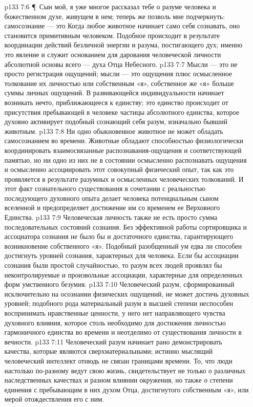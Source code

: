 \vs p133 7:6 \P\ Сын мой, я уже многое рассказал тебе о разуме человека и божественном духе, живущем в нем; теперь же позволь мне подчеркнуть: самосознание --- это  Когда любое животное начинает само себя сознавать, оно становится примитивным человеком. Подобное происходит в результате координации действий безличной энергии и разума, постигающего дух; именно это явление и служит основанием для дарования человеческой личности абсолютной основы всего --- духа Отца Небесного.
\vs p133 7:7 Мысли --- это не просто регистрация ощущений; мысли --- это ощущения плюс осмысленное толкование их личностью или собственным «я», собственное же «я» больше суммы личных ощущений. В развивающейся индивидуальности начинает возникать нечто, приближающееся к единству; это единство происходит от присутствия пребывающей в человеке частицы абсолютного единства, которое духовно активирует подобный сознающий себя разум, изначально бывший животным.
\vs p133 7:8 Ни одно обыкновенное животное не может обладать самосознанием во времени. Животные обладают способностью физиологически координировать взаимосвязанные распознавания\hyp{}ощущения и соответствующей памятью, но ни одно из них не в состоянии осмысленно распознавать ощущения и осмысленно ассоциировать этот совокупный физический опыт, так как это проявляется в результате разумных и осмысленных человеческих толкований. И этот факт сознательного существования в сочетании с реальностью последующего духовного опыта делает человека потенциальным сыном вселенной и предопределяет достижение им со временем ее Верховного Единства.
\vs p133 7:9 Человеческая личность также не есть просто сумма последовательных состояний сознания. Без эффективной работы сортировщика и ассоциатора сознания не было бы и достаточного единства, гарантирующего возникновение собственного «я». Подобный разобщенный ум едва ли способен достигнуть уровней сознания, характерных для человека. Если бы ассоциации сознания были простой случайностью, то разум всех людей проявлял бы неконтролируемые и произвольные ассоциации, характерные для определенных форм умственного безумия.
\vs p133 7:10 Человеческий разум, сформированный исключительно на осознании физических ощущений, не может достичь духовных уровней; подобного рода материальный разум в высшей степени неспособен воспринимать нравственные ценности, у него нет направляющего чувства духовного влияния, которое столь необходимо для достижения личностью гармоничного единства во времени и неотделимо от существования личности в вечности.
\vs p133 7:11 Человеческий разум начинает рано демонстрировать качества, которые являются сверхматериальными; истинно мыслящий человеческий интеллект отнюдь не связан границами времени. То, что люди настолько по\hyp{}разному ведут свою жизнь, свидетельствует не только о различных наследственных качествах и разном влиянии окружения, но также о степени единения с пребывающим в них духом Отца, достигнутого собственным «я», или мерой отождествления его с ним.
